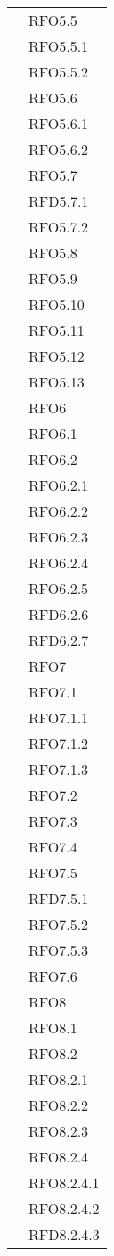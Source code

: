 \begin{longtable}{ p{12cm} | p{4cm} }
	& RFO5.5 \\
	& RFO5.5.1 \\
	& RFO5.5.2 \\
	& RFO5.6 \\
	& RFO5.6.1 \\
	& RFO5.6.2 \\
	& RFO5.7 \\
	& RFD5.7.1 \\
	& RFO5.7.2 \\
	& RFO5.8 \\
	& RFO5.9 \\
	& RFO5.10 \\
	& RFO5.11 \\
	& RFO5.12 \\
	& RFO5.13 \\
	& RFO6 \\
	& RFO6.1 \\
	& RFO6.2 \\
	& RFO6.2.1 \\
	& RFO6.2.2 \\
	& RFO6.2.3 \\
	& RFO6.2.4 \\
	& RFO6.2.5 \\
	& RFD6.2.6 \\
	& RFD6.2.7 \\
	& RFO7 \\
	& RFO7.1 \\
	& RFO7.1.1 \\
	& RFO7.1.2 \\
	& RFO7.1.3 \\
	& RFO7.2 \\
	& RFO7.3 \\
	& RFO7.4 \\
	& RFO7.5 \\
	& RFD7.5.1 \\
	& RFO7.5.2 \\
	& RFO7.5.3 \\
	& RFO7.6 \\
	& RFO8 \\
	& RFO8.1 \\
	& RFO8.2 \\
	& RFO8.2.1 \\
	& RFO8.2.2 \\
	& RFO8.2.3 \\
	& RFO8.2.4 \\
	& RFO8.2.4.1 \\
	& RFO8.2.4.2 \\
	& RFD8.2.4.3 \\

\end{longtable}
